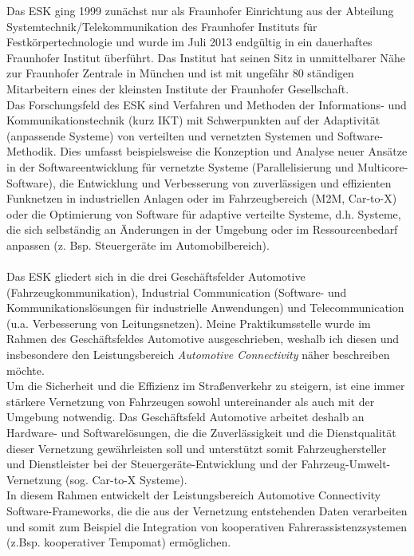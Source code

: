 \documentclass[a4paper]{scrartcl}
\begin{document}
Das ESK ging 1999 zunächst nur als Fraunhofer Einrichtung aus der Abteilung Systemtechnik/Telekommunikation des Fraunhofer Instituts für Festkörpertechnologie und wurde im Juli 2013 endgültig in ein dauerhaftes Fraunhofer Institut überführt. Das Institut hat seinen Sitz in unmittelbarer Nähe zur Fraunhofer Zentrale in München und ist mit ungefähr 80  ständigen Mitarbeitern eines der kleinsten Institute der Fraunhofer Gesellschaft. \\
Das Forschungsfeld des ESK sind Verfahren und Methoden der Informations- und Kommunikationstechnik (kurz IKT) mit Schwerpunkten auf der Adaptivität (anpassende Systeme) von verteilten und vernetzten Systemen und Software-Methodik.  Dies umfasst beispielsweise die Konzeption und Analyse neuer Ansätze in der Softwareentwicklung für vernetzte Systeme (Parallelisierung und Multicore-Software), die Entwicklung und Verbesserung von zuverlässigen und effizienten Funknetzen in industriellen Anlagen oder im Fahrzeugbereich (M2M, Car-to-X)  oder die Optimierung von Software für adaptive verteilte Systeme, d.h. Systeme, die sich selbständig an Änderungen in der Umgebung oder im Ressourcenbedarf anpassen (z. Bsp. Steuergeräte im Automobilbereich). 
\\\\
Das ESK gliedert sich in die drei Geschäftsfelder Automotive (Fahrzeugkommunikation), Industrial Communication (Software- und Kommunikationslösungen für industrielle Anwendungen) und Telecommunication (u.a. Verbesserung von Leitungsnetzen). Meine Praktikumsstelle wurde im Rahmen des Geschäftsfeldes Automotive ausgeschrieben, weshalb ich diesen und insbesondere den Leistungsbereich \emph{Automotive Connectivity}  näher beschreiben möchte. \\
Um die Sicherheit und die Effizienz im Straßenverkehr zu steigern, ist eine immer stärkere Vernetzung von Fahrzeugen sowohl untereinander als auch mit der Umgebung notwendig. 
Das Geschäftsfeld Automotive arbeitet deshalb an Hardware- und Softwarelösungen, die die Zuverlässigkeit und die Dienstqualität dieser Vernetzung gewährleisten soll und unterstützt somit Fahrzeughersteller und Dienstleister bei der Steuergeräte-Entwicklung und der Fahrzeug-Umwelt-Vernetzung (sog. Car-to-X Systeme). \\
In diesem Rahmen entwickelt der Leistungsbereich Automotive Connectivity Software-Frameworks, die die aus der Vernetzung entstehenden Daten verarbeiten und somit zum Beispiel die Integration von kooperativen Fahrerassistenzsystemen (z.Bsp. kooperativer Tempomat) ermöglichen. 
\end{document}
